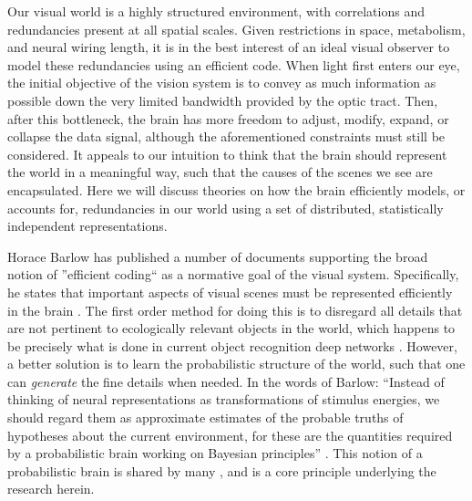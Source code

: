 Our visual world is a highly structured environment, with correlations and redundancies present at all spatial scales. Given restrictions in space, metabolism, and neural wiring length, it is in the best interest of an ideal visual observer to model these redundancies using an efficient code. When light first enters our eye, the initial objective of the vision system is to convey as much information as possible down the very limited bandwidth provided by the optic tract. Then, after this bottleneck, the brain has more freedom to adjust, modify, expand, or collapse the data signal, although the aforementioned constraints must still be considered. It appeals to our intuition to think that the brain should represent the world in a meaningful way, such that the causes of the scenes we see are encapsulated. Here we will discuss theories on how the brain efficiently models, or accounts for, redundancies in our world using a set of distributed, statistically independent representations.


Horace Barlow has published a number of documents supporting the broad notion of ''efficient coding`` as a normative goal of the visual system. Specifically, he states that important aspects of visual scenes must be represented efficiently in the brain \parencite{barlow2001redundancy}. The first order method for doing this is to disregard all details that are not pertinent to ecologically relevant objects in the world, which happens to be precisely what is done in current object recognition deep networks \citeyearpar{tishby2015deep}. However, a better solution is to learn the probabilistic structure of the world, such that one can \textit{generate} the fine details when needed. In the words of Barlow: ``Instead of thinking of neural representations as transformations of stimulus energies, we should regard them as approximate estimates of the probable truths of hypotheses about the current environment, for these are the quantities required by a probabilistic brain working on Bayesian principles'' \parencite{barlow2001redundancy}. This notion of a probabilistic brain is shared by many \parencite{kersten2003object, lee2003hierarchical, lewicki1997bayesian, olshausen2013perception}, and is a core principle underlying the research herein.


